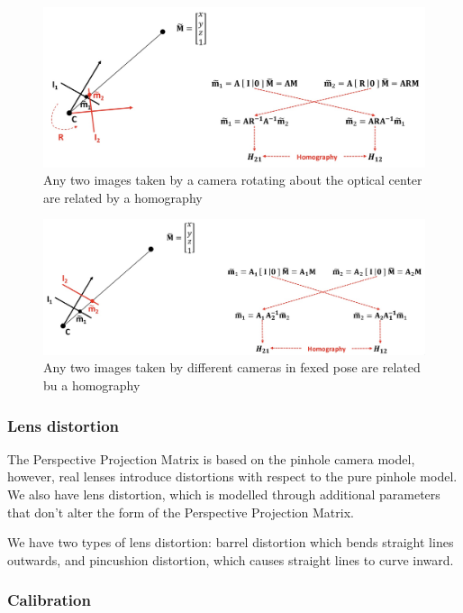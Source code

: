 \documentclass{article}
\begin{document}
\begin{figure}[htbp]
  \centering
  \includegraphics[width=0.8\linewidth]{./img/rotating_homography.jpg}
  \caption{Any two images taken by a camera rotating about the optical center are related by a homography}
  \label{fig:rotating_homography}
\end{figure}

\begin{figure}[htbp]
  \centering
  \includegraphics[width=0.8\linewidth]{./img/moving_homography.jpg}
  \caption{Any two images taken by different cameras in fexed pose are related bu a homography}
  \label{fig:moving_homography}
\end{figure}

\subsubsection{Lens distortion}

The Perspective Projection Matrix is based on the pinhole camera model, however, real lenses introduce distortions with respect to the pure pinhole model.
We also have lens distortion, which is modelled through additional parameters that don't alter the form of the Perspective Projection Matrix.

We have two types of lens distortion: barrel distortion which bends straight lines outwards, and pincushion distortion, which causes straight lines to curve inward.

\subsubsection{Calibration}
\end{document}
